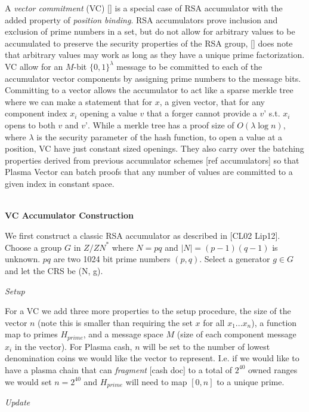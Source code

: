 \documentclass[11pt]{article}
\begin{document}
A \textit{vector commitment} (VC) [] is a special case of RSA accumulator with the added property of \textit{position binding}. RSA accumulators prove inclusion and exclusion of prime numbers in a set, but do not allow for arbitrary values to be accumulated to preserve the security properties of the RSA group, [] does note that arbitrary values may work as long as they have a unique prime factorization. VC allow for an $M$-bit $\{0,1\}^\lambda$ message to be committed to each of the accumulator vector components by assigning prime numbers to the message bits. Committing to a vector allows the accumulator to act like a sparse merkle tree where we can make a statement that for $x$, a given vector, that for any component index $x_i$ opening a value $v$ that a forger cannot provide a $v’$ s.t. $x_i$ opens to both $v$ and $v’$. While a merkle tree has a proof size of $O(\lambda \log n)$, where $\lambda$ is the security parameter of the hash function, to open a value at a position, VC have just constant sized openings. They also carry over the batching properties derived from previous accumulator schemes [ref accumulators] so that Plasma Vector can batch proofs that any number of values are committed to a given index in constant space.
\\
\\

\centerline{\textbf{VC Accumulator Construction}}

We first construct a classic RSA accumulator as described in [CL02 Lip12]. Choose a group $G$ in ${Z/ZN}^*$ where $N=pq$ and $|N| = (p-1)(q-1)$ is unknown. $pq$ are two 1024 bit prime numbers $(p,q)$. Select a generator $g \in G$ and let the CRS be (N, g). 
\\

\centerline{\textit{Setup}}

For a VC we add three more properties to the setup procedure, the size of the vector $n$ (note this is smaller than requiring the set $x$ for all $x_1...x_n$), a function map to primes $H_{prime}$, and a message space $M$ (size of each component message $x_i$ in the vector). For Plasma cash, $n$ will be set to the number of lowest denomination coins we would like the vector to represent. I.e. if we would like to have a plasma chain that can \textit{fragment} [cash doc] to a total of $2^{40}$ owned ranges we would set $n=2^{40}$ and $H_{prime}$ will need to map $[0,n]$ to a unique prime.
\\

\centerline{\textit{Update}}
\end{document}
